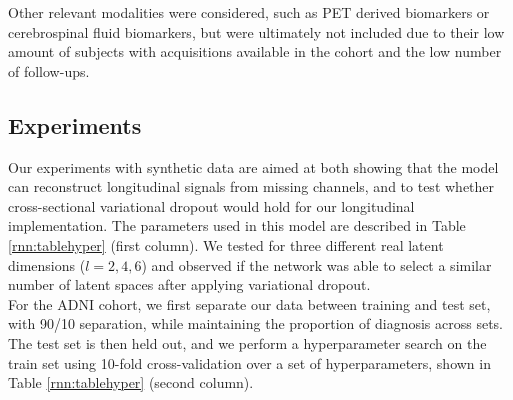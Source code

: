 Other relevant modalities were considered, such as PET derived biomarkers or cerebrospinal fluid biomarkers, but were ultimately not included due to their low amount of subjects with acquisitions available in the cohort and the low number of follow-ups. \\ 

\subsection{Experiments}

Our experiments with synthetic data are aimed at both showing that the model can reconstruct longitudinal signals from missing channels, and to test whether cross-sectional variational dropout would hold for our longitudinal implementation. The parameters used in this model are described in Table \ref{rnn:tablehyper} (first column). We tested for three different real latent dimensions ($l = {2,4,6}$) and observed if the network was able to select a similar number of latent spaces after applying variational dropout. \\

For the ADNI cohort, we first separate our data between training and test set, with 90/10 separation, while maintaining the proportion of diagnosis across sets. The test set is then held out, and we perform a hyperparameter search on the train set using 10-fold cross-validation over a set of hyperparameters, shown in Table \ref{rnn:tablehyper} (second column). \\

\begin{table}[!htbp]
\centering
{}
\caption[Hyperparameters of the model.]{Table of hyperparameters. Left column: parameters used with the synthetic model. Right column: parameters used for ADNI model optimization. Layer size: size of all layers in the network (encoder, decoder and $\phi$). RNN hidden: size of the hidden layer in the RNN.}\label{rnn:tablehyper}
\end{table}

